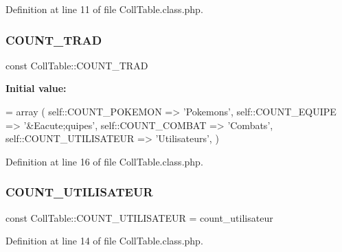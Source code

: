 Definition at line 11 of file Coll\+Table.\+class.\+php.

\mbox{\label{class_coll_table_ab79c7a291bc2c6af3798edbd15b2fd5f}} 
\subsubsection{\texorpdfstring{C\+O\+U\+N\+T\+\_\+\+T\+R\+AD}{COUNT\_TRAD}}
{\footnotesize\ttfamily const Coll\+Table\+::\+C\+O\+U\+N\+T\+\_\+\+T\+R\+AD}

{\bfseries Initial value\+:}
\begin{DoxyCode}
= array (
        self::COUNT\_POKEMON => \textcolor{stringliteral}{'Pokemons'},
        self::COUNT\_EQUIPE => \textcolor{stringliteral}{'&Eacute;quipes'},
        self::COUNT\_COMBAT => \textcolor{stringliteral}{'Combats'},
        self::COUNT\_UTILISATEUR => \textcolor{stringliteral}{'Utilisateurs'},
    )
\end{DoxyCode}


Definition at line 16 of file Coll\+Table.\+class.\+php.

\mbox{\label{class_coll_table_a3e0bf079d75f9b5f71878cb5b5408e24}} 
\subsubsection{\texorpdfstring{C\+O\+U\+N\+T\+\_\+\+U\+T\+I\+L\+I\+S\+A\+T\+E\+UR}{COUNT\_UTILISATEUR}}
{\footnotesize\ttfamily const Coll\+Table\+::\+C\+O\+U\+N\+T\+\_\+\+U\+T\+I\+L\+I\+S\+A\+T\+E\+UR = \textquotesingle{}count\+\_\+utilisateur\textquotesingle{}}



Definition at line 14 of file Coll\+Table.\+class.\+php.

\mbox{\label{class_coll_table_a3dd4c5bf0129afb677046e52ee19f11c}} 
